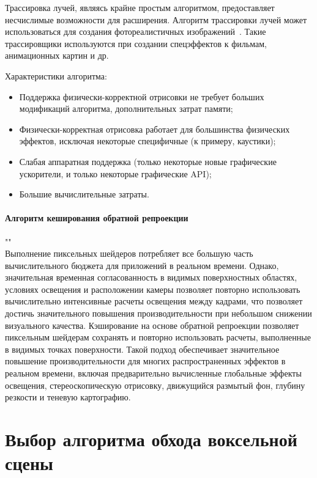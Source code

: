 Трассировка лучей, являясь крайне простым алгоритмом, предоставляет несчислимые возможности для 
расширения. Алгоритм трассировки лучей может использоваться для создания фотореалистичных
изображений~\cite{PBRT3e}. Такие трассировщики используются при создании спецэффектов к фильмам, 
анимационных картин и др. 

Характеристики алгоритма:
\begin{itemize}
    \item Поддержка физически-корректной отрисовки не требует больших модификаций алгоритма,
        дополнительных затрат памяти;
    \item Физически-корректная отрисовка работает для большинства физических эффектов,
        исключая некоторые специфичные (к примеру, каустики);
    \item Слабая аппаратная поддержка (только некоторые новые графические ускорители, и только 
        некоторые графические API);
    \item Большие вычислительные затраты.
\end{itemize}

\paragraph{Алгоритм кеширования обратной репроекции}""\\
Выполнение пиксельных шейдеров потребляет все большую часть вычислительного бюджета для приложений в 
реальном времени. Однако, значительная временная согласованность в видимых поверхностных областях, 
условиях освещения и расположении камеры позволяет повторно использовать вычислительно интенсивные 
расчеты освещения между кадрами, что позволяет достичь значительного повышения производительности 
при небольшом снижении визуального качества. 
Кэширование на основе обратной репроекции позволяет пиксельным шейдерам сохранять и повторно использовать 
расчеты, выполненные в видимых точках поверхности. 
Такой подход обеспечивает значительное повышение производительности для многих распространенных 
эффектов в реальном времени, включая предварительно вычисленные глобальные эффекты освещения, 
стереоскопическую отрисовку, движущийся размытый фон, глубину резкости и теневую картографию.~\cite{ARTSwRPC}

\section{Выбор алгоритма обхода воксельной сцены}


